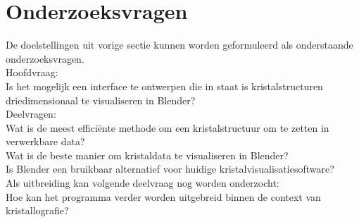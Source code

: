 \section{Onderzoeksvragen}
De doelstellingen uit vorige sectie kunnen worden geformuleerd als onderstaande onderzoeksvragen.
\\
Hoofdvraag:
\\
Is het mogelijk een interface te ontwerpen die in staat is kristalstructuren driedimensionaal te visualiseren in Blender?
\\
Deelvragen:
\\
Wat is de meest efficiënte methode om een kristalstructuur om te zetten in verwerkbare data?
\\
Wat is de beste manier om kristaldata te visualiseren in Blender?
\\
Is Blender een bruikbaar alternatief voor huidige kristalvisualisatiesoftware?
\\
Als uitbreiding kan volgende deelvraag nog worden onderzocht:
\\
Hoe kan het programma verder worden uitgebreid binnen de context van kristallografie? 


